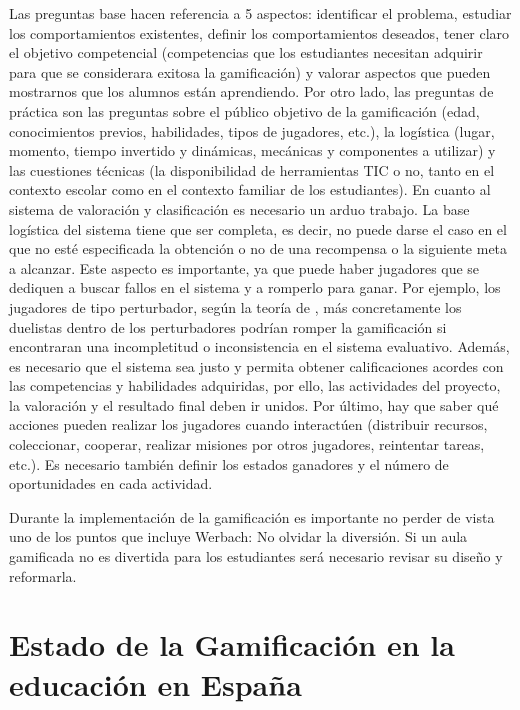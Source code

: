 \label{PasosGamificar}
%
Las preguntas base hacen referencia a 5 aspectos: identificar el problema, estudiar los comportamientos existentes, definir los comportamientos deseados, tener claro el objetivo competencial (competencias que los estudiantes necesitan adquirir para que se considerara exitosa la gamificación) y valorar aspectos que pueden mostrarnos que los alumnos están aprendiendo.
%
Por otro lado, las preguntas de práctica son las preguntas sobre el público objetivo de la gamificación (edad, conocimientos previos, habilidades, tipos de jugadores, etc.), la logística (lugar, momento, tiempo invertido y dinámicas, mecánicas y componentes a utilizar) y las cuestiones técnicas (la disponibilidad de herramientas TIC o no, tanto en el contexto escolar como en el contexto familiar de los estudiantes).
%
En cuanto al sistema de valoración y clasificación es necesario un arduo trabajo.
%
La base logística del sistema tiene que ser completa, es decir, no puede darse el caso en el que no esté especificada la obtención o no de una recompensa o la siguiente meta a alcanzar.
%
Este aspecto es importante, ya que puede haber jugadores que se dediquen a buscar fallos en el sistema y a romperlo para ganar.
%
Por ejemplo, los jugadores de tipo perturbador, según la teoría de  \citet{marczewski}, más concretamente los duelistas dentro de los perturbadores podrían romper la gamificación si encontraran una incompletitud o inconsistencia en el sistema evaluativo.
%
Además, es necesario que el sistema sea justo y permita obtener calificaciones acordes con las competencias y habilidades adquiridas, por ello, las actividades del proyecto, la valoración y el resultado final deben ir unidos.
%
Por último, hay que saber qué acciones pueden realizar los jugadores cuando interactúen (distribuir recursos, coleccionar, cooperar, realizar misiones por otros jugadores, reintentar tareas, etc.). 
%
Es necesario también definir los estados ganadores y el número de oportunidades en cada actividad.

Durante la implementación de la gamificación es importante no perder de vista uno de los puntos que incluye Werbach: No olvidar la diversión.
%
Si un aula gamificada no es divertida para los estudiantes será necesario revisar su diseño y reformarla.


\section{Estado de la Gamificación en la educación en España}

